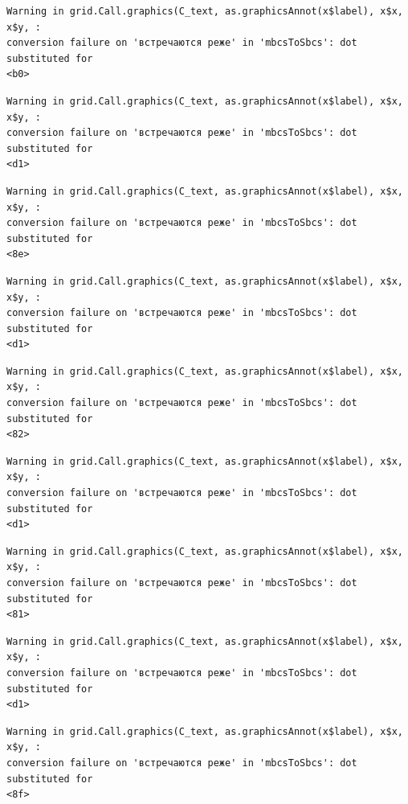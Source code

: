 \documentclass[
  letterpaper,
]{scrbook}
\theoremstyle{definition}
\theoremstyle{remark}
\begin{document}
\begin{verbatim}
Warning in grid.Call.graphics(C_text, as.graphicsAnnot(x$label), x$x, x$y, :
conversion failure on 'встречаются реже' in 'mbcsToSbcs': dot substituted for
<b0>
\end{verbatim}

\begin{verbatim}
Warning in grid.Call.graphics(C_text, as.graphicsAnnot(x$label), x$x, x$y, :
conversion failure on 'встречаются реже' in 'mbcsToSbcs': dot substituted for
<d1>
\end{verbatim}

\begin{verbatim}
Warning in grid.Call.graphics(C_text, as.graphicsAnnot(x$label), x$x, x$y, :
conversion failure on 'встречаются реже' in 'mbcsToSbcs': dot substituted for
<8e>
\end{verbatim}

\begin{verbatim}
Warning in grid.Call.graphics(C_text, as.graphicsAnnot(x$label), x$x, x$y, :
conversion failure on 'встречаются реже' in 'mbcsToSbcs': dot substituted for
<d1>
\end{verbatim}

\begin{verbatim}
Warning in grid.Call.graphics(C_text, as.graphicsAnnot(x$label), x$x, x$y, :
conversion failure on 'встречаются реже' in 'mbcsToSbcs': dot substituted for
<82>
\end{verbatim}

\begin{verbatim}
Warning in grid.Call.graphics(C_text, as.graphicsAnnot(x$label), x$x, x$y, :
conversion failure on 'встречаются реже' in 'mbcsToSbcs': dot substituted for
<d1>
\end{verbatim}

\begin{verbatim}
Warning in grid.Call.graphics(C_text, as.graphicsAnnot(x$label), x$x, x$y, :
conversion failure on 'встречаются реже' in 'mbcsToSbcs': dot substituted for
<81>
\end{verbatim}

\begin{verbatim}
Warning in grid.Call.graphics(C_text, as.graphicsAnnot(x$label), x$x, x$y, :
conversion failure on 'встречаются реже' in 'mbcsToSbcs': dot substituted for
<d1>
\end{verbatim}

\begin{verbatim}
Warning in grid.Call.graphics(C_text, as.graphicsAnnot(x$label), x$x, x$y, :
conversion failure on 'встречаются реже' in 'mbcsToSbcs': dot substituted for
<8f>
\end{verbatim}
\end{document}
